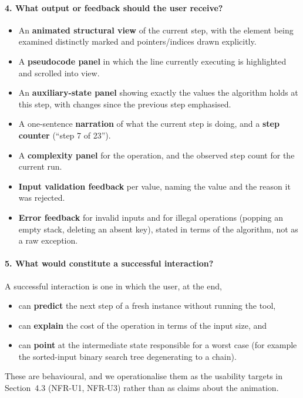 \documentclass[11pt,a4paper]{article}
\begin{document}
\paragraph{4. What output or feedback should the user receive?}
\begin{itemize}[leftmargin=1.6em,itemsep=2pt]
  \item An \textbf{animated structural view} of the current step, with the element being
        examined distinctly marked and pointers/indices drawn explicitly.
  \item A \textbf{pseudocode panel} in which the line currently executing is highlighted
        and scrolled into view.
  \item An \textbf{auxiliary-state panel} showing exactly the values the algorithm holds
        at this step, with changes since the previous step emphasised.
  \item A one-sentence \textbf{narration} of what the current step is doing, and a
        \textbf{step counter} (``step 7 of 23'').
  \item A \textbf{complexity panel} for the operation, and the observed step count for the
        current run.
  \item \textbf{Input validation feedback} per value, naming the value and the reason it
        was rejected.
  \item \textbf{Error feedback} for invalid inputs and for illegal operations (popping an
        empty stack, deleting an absent key), stated in terms of the algorithm, not as a
        raw exception.
\end{itemize}

\paragraph{5. What would constitute a successful interaction?}
A successful interaction is one in which the user, at the end,
\begin{itemize}[leftmargin=1.6em,itemsep=2pt]
  \item can \textbf{predict} the next step of a fresh instance without running the tool,
  \item can \textbf{explain} the cost of the operation in terms of the input size, and
  \item can \textbf{point} at the intermediate state responsible for a worst case (for
        example the sorted-input binary search tree degenerating to a chain).
\end{itemize}
These are behavioural, and we operationalise them as the usability targets in
Section~4.3 (NFR-U1, NFR-U3) rather than as claims about the animation.
\end{document}
